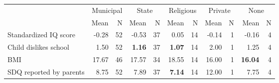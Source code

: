 \begin{tabular}{l r r r r r r r r r r}
\toprule
& \multicolumn{2}{c}{Municipal} & \multicolumn{2}{c}{State} & \multicolumn{2}{c}{Religious} & \multicolumn{2}{c}{Private} & \multicolumn{2}{c}{None} \\
& \scriptsize Mean & \scriptsize N & \scriptsize Mean & \scriptsize N & \scriptsize Mean & \scriptsize N & \scriptsize Mean & \scriptsize N & \scriptsize Mean & \scriptsize N \\
\midrule
Standardized IQ score &     -0.28 &        52 &     -0.53 &        37 &      0.05 &        14 &     -0.14 &         1 &     -0.16 &         4 \\
Child dislikes school &      1.50 &        52 & \textbf{     1.16} &        37 & \textbf{     1.07} &        14 &      2.00 &         1 &      1.25 &         4 \\
BMI &     17.67 &        46 &     17.57 &        34 &     18.55 &        14 &     16.00 &         1 & \textbf{    16.04} &         4 \\
SDQ reported by parents &      8.75 &        52 &      7.89 &        37 & \textbf{     7.14} &        14 &     12.00 &         1 &      7.75 &         4 \\
\bottomrule
\end{tabular}
